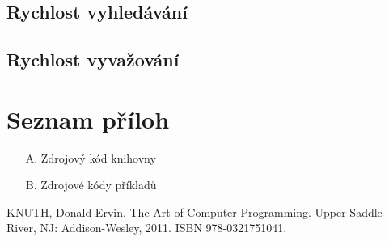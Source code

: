 \documentclass[a4paper,11pt,openany]{article}
\begin{document}
\subsection{Rychlost vyhledávání}

\subsection{Rychlost vyvažování}

\listoffigures
\listoftables
\section*{Seznam příloh}
\begin{enumerate}
	\item[A.] Zdrojový kód knihovny
	\item[B.] Zdrojové kódy příkladů
\end{enumerate}
\begin{thebibliography}{10}
	KNUTH, Donald Ervin. The Art of Computer Programming. Upper Saddle River, NJ: Addison-Wesley, 2011. ISBN 978-0321751041.
\end{thebibliography}
\end{document}
